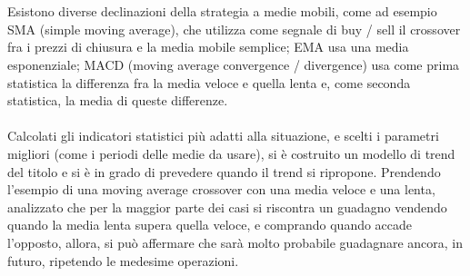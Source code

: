 \documentclass[a4paper,12pt]{report}
\begin{document}
\\~\\Esistono diverse declinazioni della strategia a medie mobili, come ad esempio SMA (simple moving average), che utilizza come segnale di buy / sell il crossover fra i prezzi di chiusura e la media mobile semplice; EMA usa una media esponenziale; MACD (moving average convergence / divergence) usa come prima statistica la differenza fra la media veloce e quella lenta e, come seconda statistica, la media di queste differenze.
\\~\\
Calcolati gli indicatori statistici più adatti alla situazione, e scelti i parametri migliori (come i periodi delle medie da usare), si è costruito un modello di trend del titolo e si è in grado di prevedere quando il trend si ripropone. Prendendo l'esempio di una moving average crossover con una media veloce e una lenta, analizzato che per la maggior parte dei casi si riscontra un guadagno vendendo quando la media lenta supera quella veloce, e comprando quando accade l'opposto, allora, si può affermare che sarà molto probabile guadagnare ancora, in futuro, ripetendo le medesime operazioni.
\end{document}
